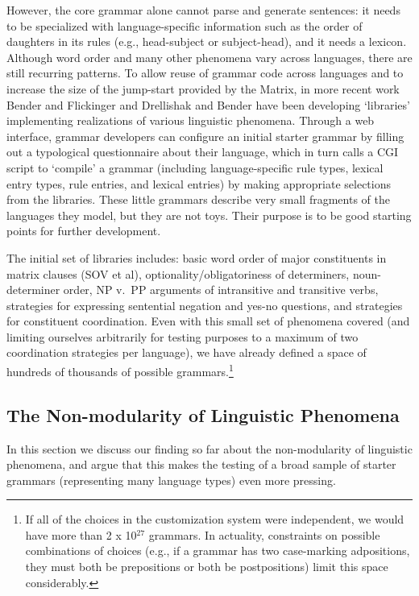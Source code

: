 \documentclass[11pt]{article}
\begin{document}
However, the core grammar alone cannot parse and generate sentences:
it needs to be specialized with language-specific information such as
the order of daughters in its rules (e.g., head-subject or
subject-head), and it needs a lexicon.  Although word order and many
other phenomena vary across languages, there are still recurring
patterns.  To allow reuse of grammar code across languages and to
increase the size of the jump-start provided by the Matrix, in more
recent work Bender and Flickinger  and
Drellishak and Bender  have been developing
`libraries' implementing realizations of various linguistic phenomena.
Through a web interface, grammar developers can configure an initial
starter grammar by filling out a typological questionnaire about their
language, which in turn calls a CGI script to `compile' a grammar
(including language-specific rule types, lexical entry types, rule
entries, and lexical entries) by making appropriate selections from
the libraries. These little grammars describe very small fragments of
the languages they model, but they are not toys.  Their purpose is to
be good starting points for further development.

The initial set of libraries includes: basic word order of major
constituents in matrix clauses (SOV et al), optionality/obligatoriness
of determiners, noun-determiner order, NP v.\ PP arguments of
intransitive and transitive verbs, strategies for expressing
sentential negation and yes-no questions, and strategies for
constituent coordination.  Even with this small set of phenomena
covered (and limiting ourselves arbitrarily for testing purposes to a
maximum of two coordination strategies per language), we have already
defined a space of hundreds of thousands of possible
grammars.\footnote{If all of the choices in the customization system
were independent, we would have more than 2 x 10$^{27}$ grammars.  In
actuality, constraints on possible combinations of choices (e.g., if a
grammar has two case-marking adpositions, they must both be
prepositions or both be postpositions) limit this space considerably.}

\subsection{The Non-modularity of Linguistic Phenomena}

In this section we discuss our finding so far about the
non-modularity of linguistic phenomena, and argue that this
makes the testing of a broad sample of starter grammars (representing
many language types) even more pressing.
\end{document}
